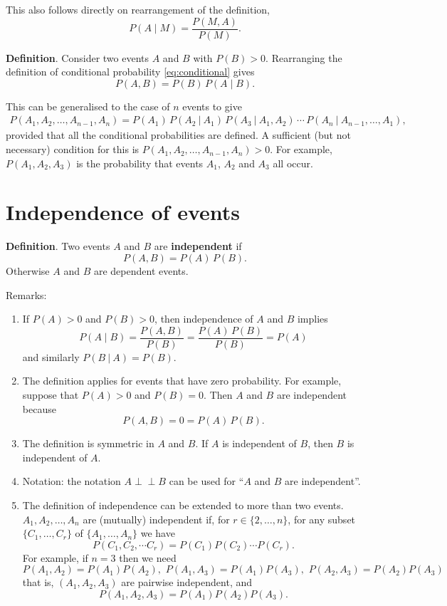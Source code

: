 \documentclass[
  british,
  11pt,
  openany, a4paper]{book}
\providecommand{\tightlist}{%
  \setlength{\itemsep}{0pt}\setlength{\parskip}{0pt}}
\begin{document}
This also follows directly on rearrangement of the definition,
\[ P(A \mid M) = \frac{P(M , A)}{P(M)}. \]

\textbf{Definition}. Consider two events \(A\) and \(B\) with \(P(B)>0\). Rearranging the definition of conditional probability \eqref{eq:conditional} gives
\begin{equation}
P(A , B) = P(B)\,P(A \mid B).  
\label{eq:mult}
\end{equation}

This can be generalised to the case of \(n\) events to give
\begin{eqnarray*}
P(A_1, A_2,\ldots, A_{n-1}, A_n) =
P(A_1)\,P(A_2~|~A_1)\,P(A_3~|~A_1,A_2)\,\cdots\,P(A_n~|~A_{n-1},\ldots,A_1),
\end{eqnarray*}
provided that all the conditional probabilities are defined. A sufficient (but not necessary) condition for this is \(P(A_1, A_2, \ldots, A_{n-1}, A_n)>0\). For example, \(P(A_1, A_2, A_3)\) is the probability that events \(A_1\), \(A_2\) and \(A_3\) all occur.

\section{Independence of events}\label{indepevents}

\textbf{Definition}. Two events \(A\) and \(B\) are \textbf{independent} if
\begin{equation}
P(A , B) = P(A) \,P(B).  
\label{eq:indep}
\end{equation}
Otherwise \(A\) and \(B\) are dependent events.

Remarks:

\begin{enumerate}
\def\labelenumi{\arabic{enumi}.}
\tightlist
\item
  If \(P(A) > 0\) and \(P(B) > 0\), then independence of \(A\) and \(B\) implies
  \[ P(A \mid B) = \frac{P(A , B)}{P(B)} = \frac{P(A)\,P(B)}{P(B)} = P(A) \]
  and similarly \(P(B~|~A)=P(B)\).
\item
  The definition applies for events that have zero probability. For example, suppose that \(P(A)>0\) and \(P(B)=0\). Then \(A\) and \(B\) are independent because
  \[ P(A , B) = 0 = P(A)\,P(B). \]
\item
  The definition is symmetric in \(A\) and \(B\). If \(A\) is independent of \(B\), then \(B\) is independent of \(A\).
\item
  Notation: the notation \(A \perp \!\!\! \perp B\) can be used for ``\(A\) and \(B\) are independent''.
\item
  The definition of independence can be extended to more than two events.
  \(A_1, A_2, \ldots, A_n\) are (mutually) independent if, for \(r \in \{2, \ldots, n\}\), for any subset \(\{ C_1, \ldots, C_r \}\) of \(\{ A_1, \ldots, A_n\}\) we have
  \[ P(C_{1} , C_{2} , \cdots C_{r}) = P(C_{1}) P(C_{2}) \cdots P(C_{r}). \]
  For example, if \(n = 3\) then we need
  \[ P(A_{1} , A_{2}) = P(A_1) P(A_2), \,\, P(A_{1} , A_{3}) = P(A_1) P(A_3), \,\, P(A_{2} , A_{3}) = P(A_2) P(A_3) \]
  that is, \((A_1, A_2, A_3)\) are pairwise independent, and
  \[ P(A_{1} , A_{2} , A_{3}) = P(A_{1}) P(A_{2}) P(A_{3}). \]
\end{enumerate}
\end{document}
